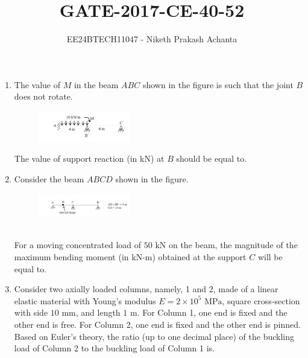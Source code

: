 \documentclass[journal]{IEEEtran}
\numberwithin{equation}{enumi}
\numberwithin{figure}{enumi}
\begin{document}

\vspace{3cm}

\title{GATE-2017-CE-40-52}
\author{EE24BTECH11047 - Niketh Prakash Achanta}
{\let\newpage\relax\maketitle}
\begin{enumerate}[start=40]

\item
The value of $M$ in the beam $ABC$ shown in the figure is such that the joint $B$ does not rotate. \\
     \begin{figure}[!ht]
    \centering
    \includegraphics[width=4cm]{figs/Q40.png}
    \end{figure}
The value of support reaction (in kN) at $B$ should be equal to.

\item
Consider the beam $ABCD$ shown in the figure.\\
     \begin{figure}[!ht]
    \centering
    \includegraphics[width=4cm]{figs/Q41.png}
    \end{figure}\\
For a moving concentrated load of $50 \text{ kN}$ on the beam, the magnitude of the maximum bending moment (in kN-m) obtained at the support $C$ will be equal to.

\item
Consider two axially loaded columns, namely, 1 and 2, made of a linear elastic material with Young's modulus $E = 2 \times 10^5 \text{ MPa}$, square cross-section with side $10 \text{ mm}$, and length $1 \text{ m}$. For Column 1, one end is fixed and the other end is free. For Column 2, one end is fixed and the other end is pinned. Based on Euler's theory, the ratio (up to one decimal place) of the buckling load of Column 2 to the buckling load of Column 1 is.


\end{enumerate}
\end{document}
